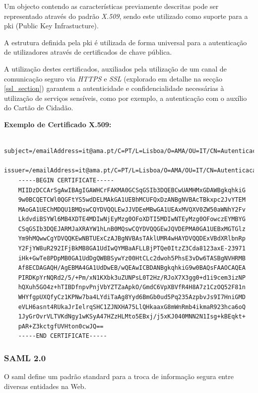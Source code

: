 Um objecto contendo as características previamente descritas pode ser representado através do padrão \emph{X.509}, sendo este utilizado como suporte para a \gls{pki} (Public Key Infrastucture).

A estrutura definida pela \gls{pki} é utilizada de forma universal para a autenticação de utilizadores através de certificados de chave pública.\cite{pki}

A utilização destes certificados, auxiliados pela utilização de um canal de comunicação seguro via \emph{HTTPS} e \emph{SSL} (explorado em detalhe na secção \ref{ssl_section}) garantem a autenticidade e confidencialidade necessárias à utilização de serviços sensíveis, como por exemplo, a autenticação com o auxílio do Cartão de Cidadão.

\vspace{10mm}
\textbf{Exemplo de Certificado X.509:}
\begin{verbatim}
    subject=/emailAddress=it@ama.pt/C=PT/L=Lisboa/O=AMA/OU=IT/CN=Autenticacao.Gov
    issuer=/emailAddress=it@ama.pt/C=PT/L=Lisboa/O=AMA/OU=IT/CN=Autenticacao.Gov
    -----BEGIN CERTIFICATE-----
    MIIDzDCCArSgAwIBAgIGAWHCrFAKMA0GCSqGSIb3DQEBCwUAMHMxGDAWBgkqhkiG
    9w0BCQETCWl0QGFtYS5wdDELMAkGA1UEBhMCUFQxDzANBgNVBAcTBkxpc2JvYTEM
    MAoGA1UEChMDQU1BMQswCQYDVQQLEwJJVDEeMBwGA1UEAxMVQXV0ZW50aWNhY2Fv
    LkdvdiBSYWl6MB4XDTE4MDIwNjEyMzg0OFoXDTI5MDIwNTEyMzg0OFowczEYMBYG
    CSqGSIb3DQEJARMJaXRAYW1hLnB0MQswCQYDVQQGEwJQVDEPMA0GA1UEBxMGTGlz
    Ym9hMQwwCgYDVQQKEwNBTUExCzAJBgNVBAsTAklUMR4wHAYDVQQDExVBdXRlbnRp
    Y2FjYW8uR292IFjBkMB8GA1UdIwQYMBaAFLLBjPTQe0ItzZ3Cda8123axE-23971
    iHk+GwTe8PDpMB0GA1UdDgQWBBSywYz00HtCLc2dwoh5PhsE3vDw6TASBgNVHRMB
    Af8ECDAGAQH/AgEBMA4GA1UdDwEB/wQEAwICBDANBgkqhkiG9w0BAQsFAAOCAQEA
    PIRDKpYrNQRd2/5/+Pm/xN1KXbk3uZUNPsL0T2Hz/RJoX7X3gg0+d1i9cem3izNP
    hQXuh5GO4z+hTIBDfnpvPnjVbYZTZaApkO/GmdC6VpXBVfR4H8A7z1CzOQ52F81n
    WHYfgpUXQfyCz1KPNw7ba4LYdiTaAg8Yyd6BmGb0ud5Pq235AzpbvJs9I7HniGMD
    eVLH6asnt4RUkaJrIelrqSHC1ZJNXHA75LlQHkaaxG8mWnRmb4ikmaR923hca6oQ
    1JyGrOvrVLTVKdNgy1wKSyA47HZzHLMto5EBxj/j5xKJ040MNN2N1Isg+kBEqkt+
    pAR+Z3kctgfUVHton0cwJQ==
    -----END CERTIFICATE-----
\end{verbatim}

\cleardoublepage
\subsubsection{SAML 2.0} \label{saml_section}

O \gls{saml} define um padrão standard para a troca de informação segura entre diversas entidades na Web.


